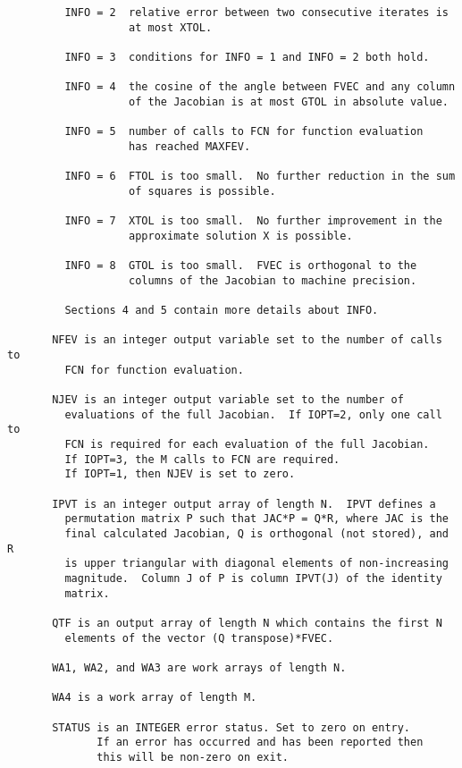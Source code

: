 \begin{verbatim}
         INFO = 2  relative error between two consecutive iterates is
                   at most XTOL.

         INFO = 3  conditions for INFO = 1 and INFO = 2 both hold.

         INFO = 4  the cosine of the angle between FVEC and any column
                   of the Jacobian is at most GTOL in absolute value.

         INFO = 5  number of calls to FCN for function evaluation
                   has reached MAXFEV.

         INFO = 6  FTOL is too small.  No further reduction in the sum
                   of squares is possible.

         INFO = 7  XTOL is too small.  No further improvement in the
                   approximate solution X is possible.

         INFO = 8  GTOL is too small.  FVEC is orthogonal to the
                   columns of the Jacobian to machine precision.

         Sections 4 and 5 contain more details about INFO.

       NFEV is an integer output variable set to the number of calls to
         FCN for function evaluation.

       NJEV is an integer output variable set to the number of
         evaluations of the full Jacobian.  If IOPT=2, only one call to
         FCN is required for each evaluation of the full Jacobian.
         If IOPT=3, the M calls to FCN are required.
         If IOPT=1, then NJEV is set to zero.

       IPVT is an integer output array of length N.  IPVT defines a
         permutation matrix P such that JAC*P = Q*R, where JAC is the
         final calculated Jacobian, Q is orthogonal (not stored), and R
         is upper triangular with diagonal elements of non-increasing
         magnitude.  Column J of P is column IPVT(J) of the identity
         matrix.

       QTF is an output array of length N which contains the first N
         elements of the vector (Q transpose)*FVEC.

       WA1, WA2, and WA3 are work arrays of length N.

       WA4 is a work array of length M.

       STATUS is an INTEGER error status. Set to zero on entry.
              If an error has occurred and has been reported then
              this will be non-zero on exit.


\end{verbatim}
